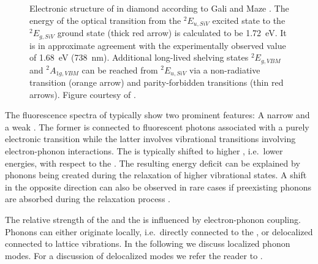     \begin{figure}[!htb]
      \centering
      \caption[Electronic structure of \sivs hosted in diamond]{Electronic structure of \sivs in diamond according to Gali and Maze \cite{Gali2013}. The energy of the optical transition from the ${}^{2}E_{u, SiV}$ excited state to the ${}^{2}E_{g, SiV}$ ground state (thick red arrow) is calculated to be \SI{1.72}{\eV}. It is in approximate agreement with the experimentally observed value of \SI{1.68}{\eV} (\SI{738}{\nm}). Additional long-lived shelving states ${}^{2}E_{g, VBM}$ and ${}^{2}A_{1g, VBM}$ can be reached from  ${}^{2}E_{u, SiV}$ via a non-radiative transition (orange arrow) and parity-forbidden transitions (thin red arrows). Figure courtesy of \cite{Hepp2014dissertation}.}
      \label{fig::term_scheme_siv}
    \end{figure}

    The fluorescence spectra of \sivs typically show two prominent features: A narrow \zpl and a weak \psb. The former is connected to fluorescent photons associated with a purely electronic transition while the latter involves vibrational transitions involving electron-phonon interactions. The \psb is typically shifted to higher \wls, i.e.\ lower energies, with respect to the \zpl. The resulting energy deficit can be explained by phonons being created during the relaxation of higher vibrational states. A shift in the opposite direction can also be observed in rare cases if preexisting phonons are absorbed during the relaxation process \cite{Iakoubovskii2000thesis}.

    The relative strength of the \zpl and the \psb is influenced by electron-phonon coupling. Phonons can either originate locally, i.e.\ directly connected to the \siv, or delocalized connected to lattice vibrations. In the following we discuss localized phonon modes. For a discussion of delocalized modes we refer the reader to \cite{Feng1993b}. 

